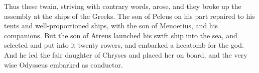 \documentclass{ransom}
\begin{document}
Thus these twain, striving with contrary words, arose, and they broke
up the assembly at the ships of the Greeks. The son of Peleus on his
part repaired to his tents and well-proportioned ships, with the son
of Menoetius, and his companions. But the son of Atreus launched
his swift ship into the sea, and selected and put into it twenty
rowers, and embarked a hecatomb for the god. And he led the fair
daughter of Chryses and placed her on board, and the very wise Odysseus
embarked as conductor.\begin{vocabpage}
\begin{vocabcommon}
\\\\\\\\\\\\\\\\\\\\\\\\\\\\\\\\\\\\\\\\\\\\\\\\\\\\\\\end{vocabcommon}
\begin{vocabuncommon}

\end{vocabuncommon}
\end{vocabpage}
\end{document}
